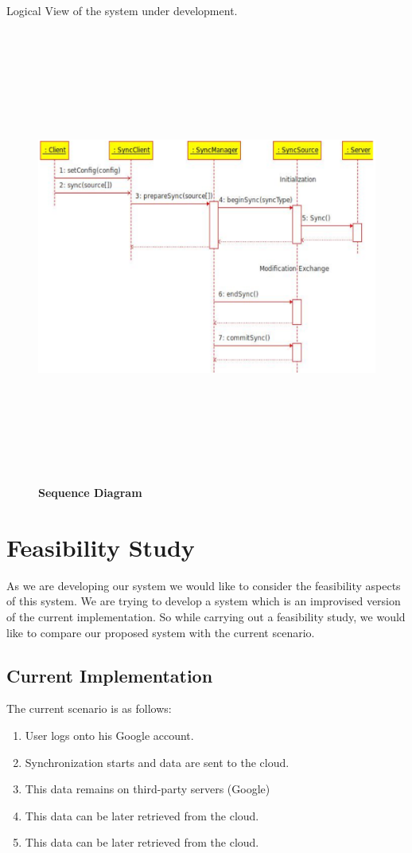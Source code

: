 Logical View of the system under development.\\[1cm]
\begin{figure}[H]
  \centering
    \includegraphics[height= 15cm, width=17cm]{project/images/seq-diagram}
  \caption{\textbf{Sequence Diagram}}
\end{figure}
\newpage
\section{Feasibility Study}
\hspace*{0.82cm}As we are developing our system we would like to consider the feasibility aspects of
this system. We are trying to develop a system which is an improvised version of the current
implementation. So while carrying out a feasibility study, we would like to compare our
proposed system with the current scenario.
\subsection{Current Implementation}
The current scenario is as follows:
\begin{enumerate}
 \item User logs onto his Google account.
 \item Synchronization starts and data are sent to the cloud.
 \item This data remains on third-party servers (Google)
 \item This data can be later retrieved from the cloud.
 \item This data can be later retrieved from the cloud.
\end{enumerate}
